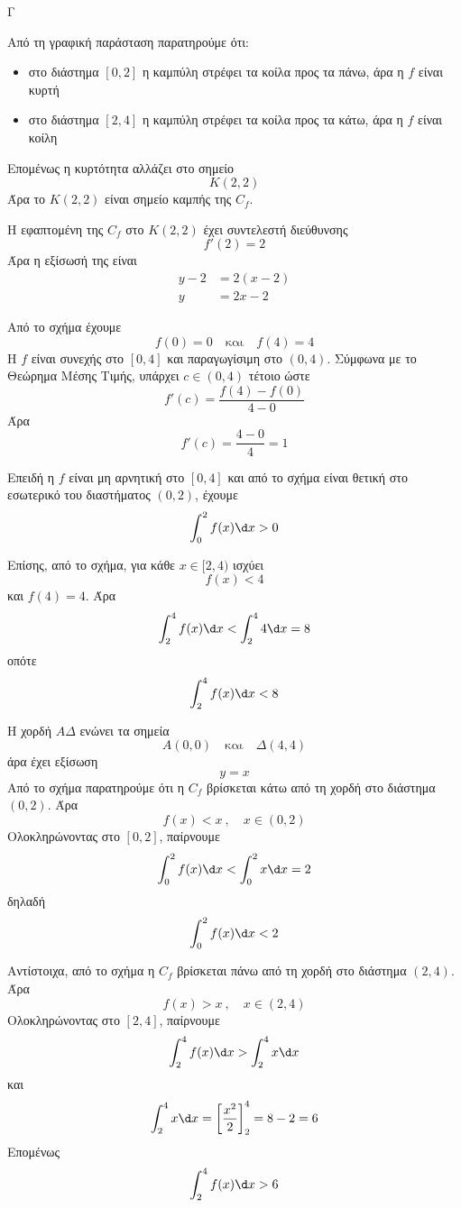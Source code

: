\begin{thema}{Γ}
\begin{erwthma}
\item Από τη γραφική παράσταση παρατηρούμε ότι:
\begin{itemize}
\item στο διάστημα $[0,2]$ η καμπύλη στρέφει τα κοίλα προς τα πάνω, άρα η $f$ είναι κυρτή
\item στο διάστημα $[2,4]$ η καμπύλη στρέφει τα κοίλα προς τα κάτω, άρα η $f$ είναι κοίλη
\end{itemize}
Επομένως η κυρτότητα αλλάζει στο σημείο
\[
K(2,2)
\]
Άρα το $K(2,2)$ είναι σημείο καμπής της $C_f$.

\item Η εφαπτομένη της $C_f$ στο $K(2,2)$ έχει συντελεστή διεύθυνσης
\[
f'(2)=2
\]
Άρα η εξίσωσή της είναι
\begin{align*}
y-2&=2(x-2)\\
y&=2x-2
\end{align*}

Από το σχήμα έχουμε
\[
f(0)=0
\quad \text{και}\quad
f(4)=4
\]
Η $f$ είναι συνεχής στο $[0,4]$ και παραγωγίσιμη στο $(0,4)$.
Σύμφωνα με το Θεώρημα Μέσης Τιμής, υπάρχει $c\in(0,4)$ τέτοιο ώστε
\[
f'(c)=\frac{f(4)-f(0)}{4-0}
\]
Άρα
\[
f'(c)=\frac{4-0}{4}=1
\]

\item Επειδή η $f$ είναι μη αρνητική στο $[0,4]$ και από το σχήμα είναι θετική στο εσωτερικό του διαστήματος $(0,2)$, έχουμε
\[
\dint_0^2 f(x)\d x>0
\]

Επίσης, από το σχήμα, για κάθε $x\in[2,4)$ ισχύει
\[
f(x)<4
\]
και $f(4)=4$.
Άρα
\[
\dint_2^4 f(x)\d x<\dint_2^4 4\d x=8
\]
οπότε
\[
\dint_2^4 f(x)\d x<8
\]

\item Η χορδή $A\Delta$ ενώνει τα σημεία
\[
A(0,0)
\quad \text{και}\quad
\Delta(4,4)
\]
άρα έχει εξίσωση
\[
y=x
\]
Από το σχήμα παρατηρούμε ότι η $C_f$ βρίσκεται κάτω από τη χορδή στο διάστημα $(0,2)$.
Άρα
\[
f(x)<x\ ,\quad x\in(0,2)
\]
Ολοκληρώνοντας στο $[0,2]$, παίρνουμε
\[
\dint_0^2 f(x)\d x<\dint_0^2 x\d x=2
\]
δηλαδή
\[
\dint_0^2 f(x)\d x<2
\]

Αντίστοιχα, από το σχήμα η $C_f$ βρίσκεται πάνω από τη χορδή στο διάστημα $(2,4)$.
Άρα
\[
f(x)>x\ ,\quad x\in(2,4)
\]
Ολοκληρώνοντας στο $[2,4]$, παίρνουμε
\[
\dint_2^4 f(x)\d x>\dint_2^4 x\d x
\]
και
\[
\dint_2^4 x\d x=\left[\frac{x^2}{2}\right]_2^4=8-2=6
\]
Επομένως
\[
\dint_2^4 f(x)\d x>6
\]
\end{erwthma}
\end{thema}

